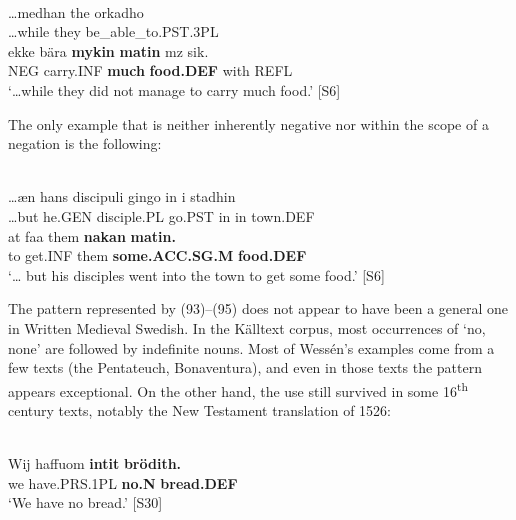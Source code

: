
\ea \label{} 
\\
\gll …medhan  the  orkadho\\
…while  they  be\_able\_to.PST.3PL\\
\gll ekke  bära  \textbf{mykin} \textbf{  matin} mz  sik.\\
NEG  carry.INF  \textbf{much} \textbf{food.DEF} with  REFL\\
\glt  ‘…while they did not manage to carry much food.’ [S6]

\z

The only example that is neither inherently negative nor within the scope of a negation is the following:


\ea \label{} 
\\
\gll …æn  hans  discipuli  gingo  in  i  stadhin\\
…but  he.GEN  disciple.PL  go.PST  in  in  town.DEF\\
\gll at  faa  them  \textbf{nakan} \textbf{matin.}\\
to  get.INF  them  \textbf{some.ACC.SG.M} \textbf{food.DEF}\\
\glt ‘… but his disciples went into the town to get some food.’ [S6]

\z

The pattern represented by (93)–(95) does not appear to have been a general one in Written Medieval Swedish. In the Källtext corpus, most occurrences of  ‘no, none’ are followed by indefinite nouns. Most of Wessén’s examples come from a few texts (the Pentateuch, Bonaventura), and even in those texts the pattern appears exceptional. On the other hand, the use still survived in some 16\textsuperscript{th} century texts, notably the New Testament translation of 1526:


\ea \label{} 
\\
\gll Wij  haffuom  \textbf{intit} \textbf{brödith.}\\
we  have.PRS.1PL  \textbf{no.N} \textbf{bread.DEF}\\
\glt ‘We have no bread.’ [S30]

